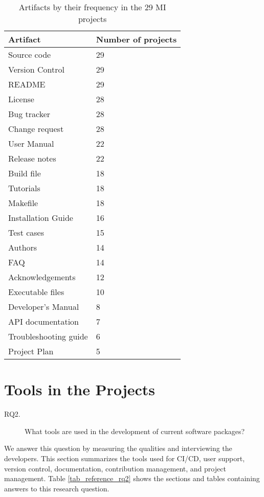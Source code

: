 \begin{table}[H]
\centering
\begin{tabular}{ll}
\hline
Artifact & Number of projects \\ \hline
Source code & 29 \\
Version Control & 29 \\
README & 29 \\
License & 28 \\
Bug tracker & 28 \\
Change request & 28 \\
User Manual & 22 \\
Release notes & 22 \\
Build file & 18 \\
Tutorials & 18 \\
Makefile & 18 \\
Installation Guide & 16 \\
Test cases & 15 \\
Authors & 14 \\
FAQ & 14 \\
Acknowledgements & 12 \\
Executable files & 10 \\
Developer's Manual & 8 \\
API documentation & 7 \\
Troubleshooting guide & 6 \\
Project Plan & 5 \\ \hline
\end{tabular}
\caption{\label{tab_artifacts_frequency}Artifacts by their frequency in the 29 MI projects}
\end{table}

\section{Tools in the Projects}
\label{sec_rq_tools}
\begin{description}
\item[RQ2.] What tools are used in the development of current software packages?
\end{description}

We answer this question by measuring the qualities and interviewing the developers. This section summarizes the tools used for CI/CD, user support, version control, documentation, contribution management, and project management. Table \ref{tab_reference_rq2} shows the sections and tables containing answers to this research question.

